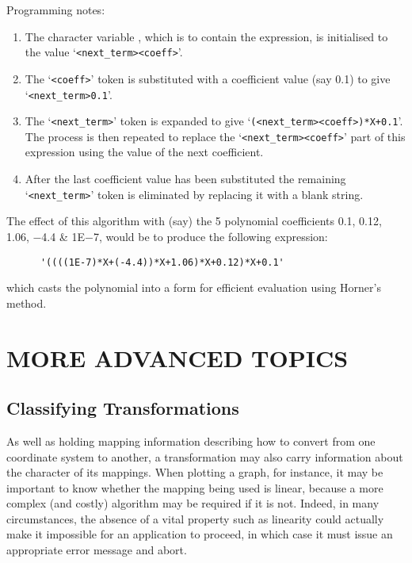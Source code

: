 Programming notes:

\begin{enumerate}

\item The character variable , which is to contain the 
expression, is initialised to the value `\verb#<next_term><coeff>#'. 

\item The `\verb#<coeff>#' token is substituted with a coefficient
value (say 0.1) to give `\verb#<next_term>0.1#'.

\item The `\verb#<next_term>#' token is expanded to give
`\verb#(<next_term><coeff>)*X+0.1#'. 
The process is then repeated to replace the `\verb#<next_term><coeff>#'
part of this expression using the value of the next coefficient.

\item After the last coefficient value has been substituted the remaining
`\verb#<next_term>#' token is eliminated by replacing it with a blank
string. 

\end{enumerate}

The effect of this algorithm with (say) the 5 polynomial coefficients 0.1,
0.12, 1.06, $-$4.4 \& 1E$-$7, would be to produce the following expression:

\begin{verbatim}
      '((((1E-7)*X+(-4.4))*X+1.06)*X+0.12)*X+0.1'
\end{verbatim}

which casts the polynomial into a form for efficient evaluation using
Horner's method. 
\exampledone


\section{MORE ADVANCED TOPICS}


\subsection{Classifying Transformations}

\label{section:advanced:classification}

As well as holding mapping information describing how to convert from one
coordinate system to another, a transformation may also carry information
about the character of its mappings. 
When plotting a graph, for instance, it may be important to know whether the
mapping being used is linear, because a more complex (and costly) algorithm
may be required if it is not. 
Indeed, in many circumstances, the absence of a vital property such as
linearity could actually make it impossible for an application to proceed,
in which case it must issue an appropriate error message and abort. 

